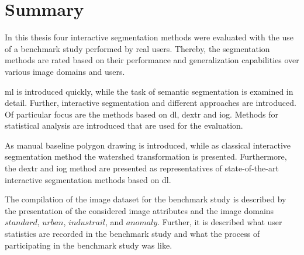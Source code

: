 
\section{Summary}

In this thesis four interactive segmentation methods were evaluated with the use of a benchmark study performed by real users.
Thereby, the segmentation methods are rated based on their performance and generalization capabilities over various image domains and users.


\gls{ml} is introduced quickly, while the task of semantic segmentation is examined in detail.
Further, interactive segmentation and different approaches are introduced.
Of particular focus are the methods based on \gls{dl}, \gls{dextr} and \gls{iog}.
Methods for statistical analysis are introduced that are used for the evaluation.

As manual baseline polygon drawing is introduced, while as classical interactive segmentation method the watershed transformation is presented.
Furthermore, the \gls{dextr} \cite{Man18-DEXTR} and \gls{iog} \cite{Zha20-IOG} method are presented as representatives of state-of-the-art interactive segmentation methods based on \gls{dl}.

The compilation of the image dataset for the benchmark study is described by the presentation of the considered image attributes and the image domains $ standard $, $ urban $, $ industrail $, and $ anomaly $.
Further, it is described what user statistics are recorded in the benchmark study and what the process of participating in the benchmark study was like.

